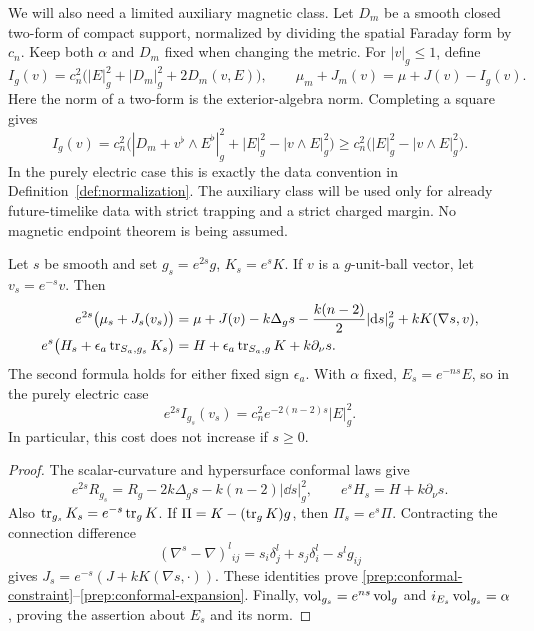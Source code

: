 We will also need a limited auxiliary magnetic class.  Let $D_m$ be a
smooth closed two-form of compact support, normalized by dividing the
spatial Faraday form by $c_n$.  Keep both $\alpha$ and $D_m$ fixed when
changing the metric.  For $|v|_g\leq1$, define
\begin{equation}
 \label{prep:electromagnetic-cost}
 I_g(v)=c_n^2\bigl(|E|_g^2+|D_m|_g^2+2D_m(v,E)\bigr),
 \qquad \mu_m+J_m(v)=\mu+J(v)-I_g(v).
\end{equation}
Here the norm of a two-form is the exterior-algebra norm.  Completing a
square gives
\begin{equation}
 \label{prep:electromagnetic-square}
 I_g(v)
 =c_n^2\bigl(|D_m+v^\flat\wedge E^\flat|_g^2
             +|E|_g^2-|v\wedge E|_g^2\bigr)
 \geq c_n^2\bigl(|E|_g^2-|v\wedge E|_g^2\bigr).
\end{equation}
In the purely electric case this is exactly the data convention in
Definition~\ref{def:normalization}.  The auxiliary class will be used
only for already future-timelike data with strict trapping and a strict
charged margin.  No magnetic endpoint theorem is being assumed.

\begin{lemma}
\label{prep:conformal}
Let $s$ be smooth and set $g_s=e^{2s}g$, $K_s=e^sK$.  If $v$ is a
$g$-unit-ball vector, let $v_s=e^{-s}v$.  Then
\begin{align}
 \label{prep:conformal-constraint}
 e^{2s}\bigl(\mu_s+J_s(v_s)\bigr)
 &=\mu+J(v)-k\Delta_gs-\frac{k(n-2)}2|\mathrm d s|_g^2
       +kK(\nabla s,v),\\
 \label{prep:conformal-expansion}
 e^s\bigl(H_s+\epsilon_a\operatorname{tr}_{S_a,g_s}K_s\bigr)
 &=H+\epsilon_a\operatorname{tr}_{S_a,g}K+k\partial_\nu s.
\end{align}
The second formula holds for either fixed sign $\epsilon_a$.
With $\alpha$ fixed, $E_s=e^{-ns}E$, so in the purely electric case
\begin{equation}
 \label{prep:electric-conformal-cost}
 e^{2s}I_{g_s}(v_s)=c_n^2e^{-2(n-2)s}|E|_g^2.
\end{equation}
In particular, this cost does not increase if $s\geq0$.
\end{lemma}

\begin{proof}
The scalar-curvature and hypersurface conformal laws give
\[
 e^{2s}R_{g_s}=R_g-2k\Delta_gs-k(n-2)|\dd s|_g^2,
 \qquad e^sH_s=H+k\partial_\nu s.
\]
Also $\operatorname{tr}_{g_s}K_s=e^{-s}\operatorname{tr}_gK$.  If
$\Pi=K-(\operatorname{tr}_gK)g$, then $\Pi_s=e^s\Pi$.
Contracting the connection difference
\[
 (\nabla^s-\nabla)^l{}_{ij}
 =s_i\delta_j^l+s_j\delta_i^l-s^lg_{ij}
\]
gives
$J_s=e^{-s}(J+kK(\nabla s,\cdot))$.
These identities prove
\eqref{prep:conformal-constraint}--\eqref{prep:conformal-expansion}.
Finally, $\operatorname{vol}_{g_s}=e^{ns}\operatorname{vol}_g$ and
$i_{E_s}\operatorname{vol}_{g_s}=\alpha$, proving the assertion about $E_s$ and its
norm.
\end{proof}

